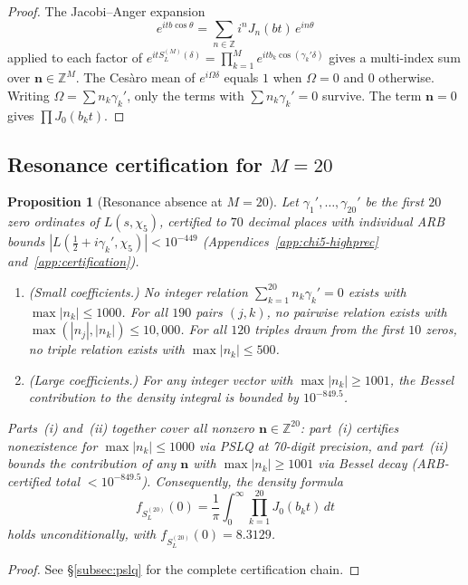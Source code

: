 \documentclass[12pt,reqno]{amsart}
\theoremstyle{plain}
\newtheorem{proposition}[theorem]{Proposition}
\theoremstyle{definition}
\theoremstyle{remark}
\newcommand{\Z}{\mathbb{Z}}
\begin{document}
\begin{proof}
The Jacobi--Anger expansion
\[
  e^{itb\cos\theta} = \sum_{n \in \Z} i^n J_n(bt)\,e^{in\theta}
\]
applied to each factor of $e^{itS_L^{(M)}(\delta)} = \prod_{k=1}^M e^{itb_k\cos(\gamma_k'\delta)}$ gives a multi-index sum over $\mathbf{n} \in \Z^M$.  The Ces\`aro mean of $e^{i\Omega\delta}$ equals $1$ when $\Omega = 0$ and $0$ otherwise.  Writing $\Omega = \sum n_k\gamma_k'$, only the terms with $\sum n_k\gamma_k' = 0$ survive.  The term $\mathbf{n} = 0$ gives $\prod J_0(b_k t)$.
\end{proof}


\subsection{Resonance certification for \texorpdfstring{$M = 20$}{M = 20}}

\begin{proposition}[Resonance absence at $M = 20$]\label{prop:resonance-cert}
Let $\gamma_1',\ldots,\gamma_{20}'$ be the first $20$ zero ordinates of $L(s,\chi_5)$,
certified to $70$ decimal places with individual ARB bounds
$|L(\tfrac{1}{2}+i\gamma_k',\chi_5)| < 10^{-449}$
(Appendices~\ref{app:chi5-highprec} and~\ref{app:certification}).
\begin{enumerate}[label=\textup{(\roman*)}]
\item \textup{(Small coefficients.)} No integer relation $\sum_{k=1}^{20} n_k\gamma_k' = 0$
exists with $\max|n_k| \leq 1000$. For all $190$ pairs $(j,k)$, no pairwise relation
exists with $\max(|n_j|,|n_k|) \leq 10{,}000$. For all $120$ triples drawn from the
first $10$ zeros, no triple relation exists with $\max|n_k| \leq 500$.
\item \textup{(Large coefficients.)} For any integer vector with $\max|n_k| \geq 1001$,
the Bessel contribution to the density integral is bounded by $10^{-849.5}$.
\end{enumerate}
Parts~(i) and~(ii) together cover all nonzero $\mathbf{n} \in \Z^{20}$: part~(i) certifies nonexistence for $\max|n_k| \leq 1000$ via PSLQ at 70-digit precision, and part~(ii) bounds the contribution of any $\mathbf{n}$ with $\max|n_k| \geq 1001$ via Bessel decay (ARB-certified total $< 10^{-849.5}$).  Consequently, the density formula
\[
  f_{S_L^{(20)}}(0) = \frac{1}{\pi}\int_0^\infty \prod_{k=1}^{20} J_0(b_k t)\,dt
\]
holds unconditionally, with $f_{S_L^{(20)}}(0) = 8.3129$.
\end{proposition}

\begin{proof}
See \S\ref{subsec:pslq} for the complete certification chain.
\end{proof}
\end{document}
